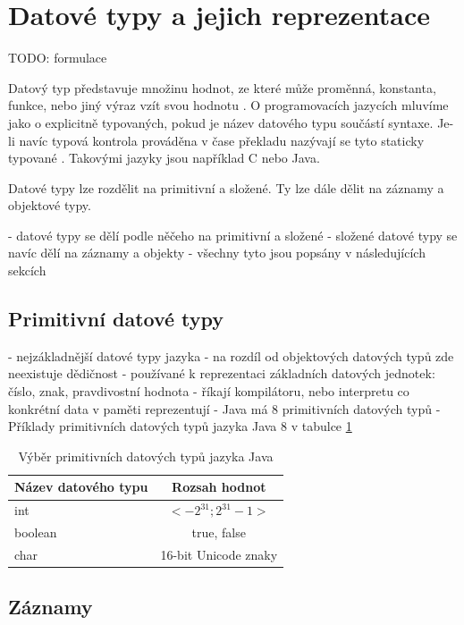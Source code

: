 \documentclass[czech,DP]{thesiskiv}
\begin{document}
\section{Datové typy a jejich reprezentace}

TODO: formulace

Datový typ představuje množinu hodnot, ze které může proměnná, konstanta, funkce, nebo jiný výraz vzít svou hodnotu \cite{dataType}. O programovacích jazycích mluvíme jako o explicitně typovaných, pokud je název datového typu součástí syntaxe. Je-li navíc typová kontrola prováděna v čase překladu nazývají se tyto staticky typované \cite{cardelli2004}. Takovými jazyky jsou například C nebo Java.

Datové typy lze rozdělit na primitivní a složené. Ty lze dále dělit na záznamy a objektové typy.

 - datové typy se dělí podle něčeho na primitivní a složené
 - složené datové typy se navíc dělí na záznamy a objekty
 - všechny tyto jsou popsány v následujících sekcích
 
\subsection{Primitivní datové typy}
 
  - nejzákladnější datové typy jazyka
  - na rozdíl od objektových datových typů zde neexistuje dědičnost
  - používané k reprezentaci základních datových jednotek: číslo, znak, pravdivostní hodnota
  - říkají kompilátoru, nebo interpretu co konkrétní data v paměti reprezentují
  - Java má 8 primitivních datových typů
  - Příklady primitivních datových typů jazyka Java 8 v tabulce \ref{tab:java-prim-types}
 
\begin{table}[h]
	\centering
	\begin{tabular}{|l|c|}
		\hline
		Název datového typu & Rozsah hodnot \\
		\hline
		\hline
		int & $<-2^{31};2^{31}-1>$ \\
		\hline
		boolean & true, false \\
		\hline
		char & 16-bit Unicode znaky \\
		\hline
	\end{tabular}
	\caption{Výběr primitivních datových typů jazyka Java}
	\label{tab:java-prim-types}
\end{table}

\subsection{Záznamy}
\end{document}
